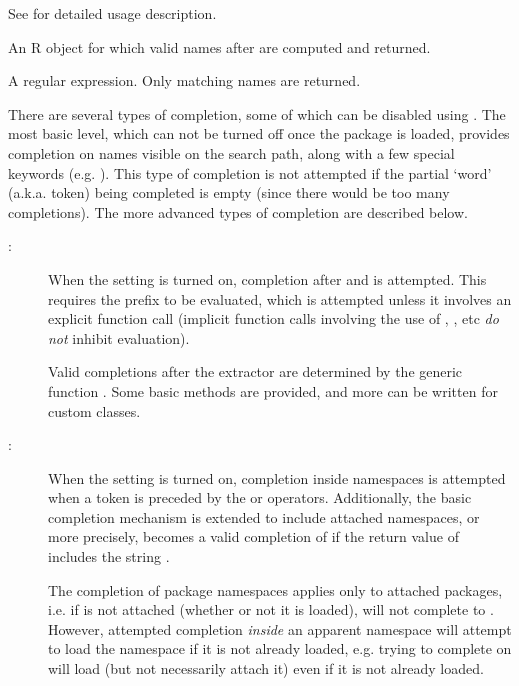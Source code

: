 \begin{Arguments}
\begin{ldescription}
\begin{description}
\end{description}

See  for detailed usage description.


\item[\code{x}]  An R object for which valid names after 
are computed and returned.


\item[\code{pattern}]  A regular expression.  Only matching names are
returned.

\end{ldescription}
\end{Arguments}
%
\begin{Details}\relax
There are several types of completion, some of which can be disabled
using .  The most basic level, which can not be
turned off once the package is loaded, provides completion on names
visible on the search path, along with a few special keywords
(e.g. ).  This type of completion is not attempted if the
partial `word' (a.k.a. token) being completed is empty (since
there would be too many completions).  The more advanced types of
completion are described below.

\begin{description}


\item[:] 
When the  setting is turned on, completion after
\code{\$} and  is attempted.  This requires the prefix to
be evaluated, which is attempted unless it involves an explicit
function call (implicit function calls involving the use of
\code{[}, \code{\$}, etc \emph{do not} inhibit evaluation).

Valid completions after the \code{\$} extractor are determined by
the generic function .  Some basic methods are
provided, and more can be written for custom classes.


\item[:] 
When the  setting is turned on, completion inside
namespaces is attempted when a token is preceded by the \code{::}
or \code{:::} operators.  Additionally, the basic completion
mechanism is extended to include attached namespaces, or more
precisely,  becomes a valid completion of
 if the return value of  includes
the string .

The completion of package namespaces applies only to attached
packages, i.e. if  is not attached (whether or not it
is loaded),  will not complete to .
However, attempted completion \emph{inside} an apparent namespace
will attempt to load the namespace if it is not already loaded,
e.g. trying to complete on  will load 
(but not necessarily attach it) even if it is not already loaded.



\end{description}
\end{Details}
